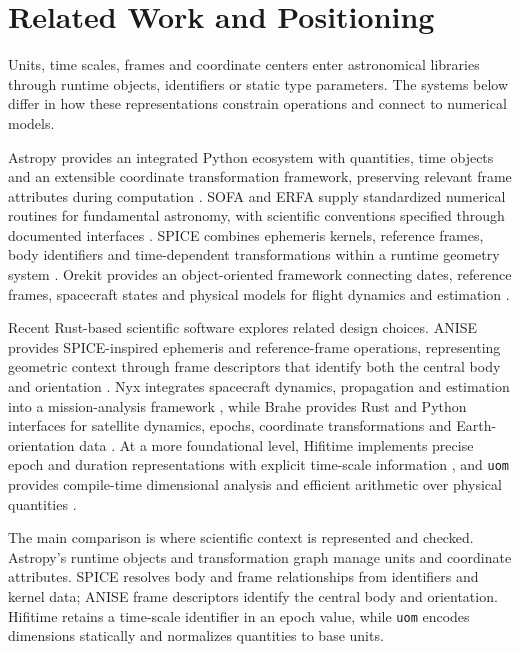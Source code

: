 \section{Related Work and Positioning}

Units, time scales, frames and coordinate centers enter astronomical libraries through runtime
objects, identifiers or static type parameters. The systems below differ in how these
representations constrain operations and connect to numerical models.

Astropy provides an integrated Python ecosystem with quantities, time objects and an extensible
coordinate transformation framework, preserving relevant frame attributes during computation
\cite{astropy2022}. SOFA and ERFA supply standardized numerical routines for fundamental astronomy,
with scientific conventions specified through documented interfaces \cite{sofa,erfa}. SPICE
combines ephemeris kernels, reference frames, body identifiers and time-dependent transformations
within a runtime geometry system \cite{acton1996spice,acton2018spice}. Orekit provides an
object-oriented framework connecting dates, reference frames, spacecraft states and physical models
for flight dynamics and estimation \cite{orekit2016,orekitSoftware}.

Recent Rust-based scientific software explores related design choices. ANISE provides
SPICE-inspired ephemeris and reference-frame operations, representing geometric context through
frame descriptors that identify both the central body and orientation \cite{anise,aniseFrames}. Nyx
integrates spacecraft dynamics, propagation and estimation into a mission-analysis framework
\cite{nyx}, while Brahe provides Rust and Python interfaces for satellite dynamics, epochs,
coordinate transformations and Earth-orientation data \cite{brahe}. At a more foundational level,
Hifitime implements precise epoch and duration representations with explicit time-scale information
\cite{hifitime}, and \texttt{uom} provides compile-time dimensional analysis and efficient
arithmetic over physical quantities \cite{uom}.

The main comparison is where scientific context is represented and checked. Astropy's runtime
objects and transformation graph manage units and coordinate attributes. SPICE resolves body and
frame relationships from identifiers and kernel data; ANISE frame descriptors identify the central
body and orientation. Hifitime retains a time-scale identifier in an epoch value, while
\texttt{uom} encodes dimensions statically and normalizes quantities to base units.

